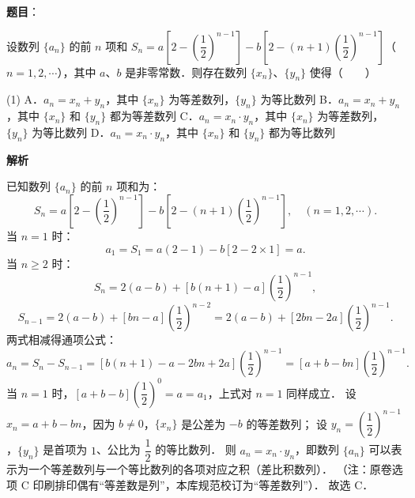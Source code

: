 \begin{answer}

\textbf{题目}：

设数列 $\{a_n\}$ 的前 $n$ 项和 $S_n = a\left[2 - \left(\dfrac{1}{2}\right)^{n-1}\right] - b\left[2 - (n + 1)\left(\dfrac{1}{2}\right)^{n-1}\right]$（$n = 1, 2, \cdots$），其中 $a$、$b$ 是非零常数．则存在数列 $\{x_n\}$、$\{y_n\}$ 使得\mbox{（　　）}

\begin{gkopts}(1)
\task A．$a_n = x_n + y_n$，其中 $\{x_n\}$ 为等差数列，$\{y_n\}$ 为等比数列
\task B．$a_n = x_n + y_n$，其中 $\{x_n\}$ 和 $\{y_n\}$ 都为等差数列
\task C．$a_n = x_n \cdot y_n$，其中 $\{x_n\}$ 为等差数列，$\{y_n\}$ 为等比数列
\task D．$a_n = x_n \cdot y_n$，其中 $\{x_n\}$ 和 $\{y_n\}$ 都为等比数列
\end{gkopts}

\textbf{解析}

已知数列 $\{a_n\}$ 的前 $n$ 项和为：
\nopagebreak[4]
\[
S_n = a\left[2 - \left(\frac{1}{2}\right)^{n-1}\right] - b\left[2 - (n + 1)\left(\frac{1}{2}\right)^{n-1}\right], \quad (n = 1, 2, \cdots).
\]
当 $n = 1$ 时：
\nopagebreak[4]
\[
a_1 = S_1 = a(2 - 1) - b[2 - 2 \times 1] = a.
\]
当 $n \geqslant 2$ 时：
\nopagebreak[4]
\[
S_n = 2(a - b) + [b(n + 1) - a]\left(\frac{1}{2}\right)^{n-1},
\]
\nopagebreak[4]
\[
S_{n-1} = 2(a - b) + [bn - a]\left(\frac{1}{2}\right)^{n-2} = 2(a - b) + [2bn - 2a]\left(\frac{1}{2}\right)^{n-1}.
\]
两式相减得通项公式：
\nopagebreak[4]
\[
a_n = S_n - S_{n-1} = [b(n + 1) - a - 2bn + 2a]\left(\frac{1}{2}\right)^{n-1} = [a + b - bn]\left(\frac{1}{2}\right)^{n-1}.
\]
当 $n = 1$ 时，$[a + b - b]\left(\dfrac{1}{2}\right)^0 = a = a_1$，上式对 $n = 1$ 同样成立．
设 $x_n = a + b - bn$，因为 $b \neq 0$，$\{x_n\}$ 是公差为 $-b$ 的等差数列；
设 $y_n = \left(\dfrac{1}{2}\right)^{n-1}$，$\{y_n\}$ 是首项为 $1$、公比为 $\dfrac{1}{2}$ 的等比数列．
则 $a_n = x_n \cdot y_n$，即数列 $\{a_n\}$ 可以表示为一个等差数列与一个等比数列的各项对应之积（差比积数列）．
（注：原卷选项 C 印刷排印偶有“等差数是列”，本库规范校订为“等差数列”）．
故选 C．


\end{answer}
